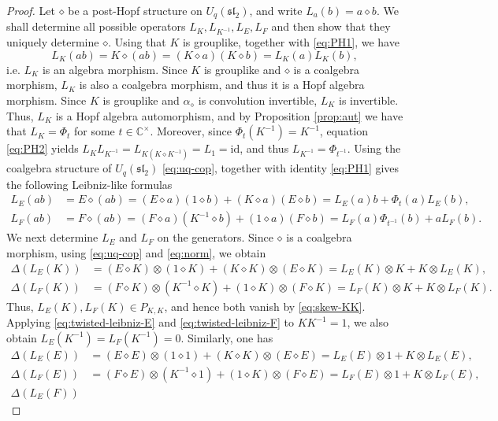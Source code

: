 \documentclass[11pt,english]{article}
\newcommand{\id}{\mathrm{id}}
\newcommand{\Del}{\Delta}
\newcommand{\act}{\mathbin{\diamond}}
\theoremstyle{definition}
\begin{document}
\begin{proof}
Let $\act$ be a post-Hopf structure on
$U_q(\mathfrak{sl}_2)$, and write
$L_a(b)=a\act b$.
We shall determine all possible operators
$L_K,L_{K^{-1}},L_E,L_F$ and then show that
they uniquely determine $\act$.
Using that $K$ is grouplike, together with \eqref{eq:PH1}, we have
\[L_K(ab)= K \act(ab)= (K \act a)(K \act b) = L_K(a) L_K(b), \]
i.e. $L_K$ is an algebra morphism. 
Since $K$ is grouplike and $\act$ is a coalgebra morphism, $L_K$
is also a coalgebra morphism, and thus it is a Hopf algebra morphism. 
Since $K$ is grouplike and $\alpha_{\act}$
is convolution invertible, $L_K$ is invertible.
Thus, $L_K$ is a Hopf algebra automorphism, and by
Proposition \ref{prop:aut} we have that $L_K=\Phi_t$
for some $t\in\mathbb{C}^\times$.
Moreover, since $\Phi_t(K^{-1})=K^{-1}$,
equation \eqref{eq:PH2} yields $L_KL_{K^{-1}}
=L_{K(K\act K^{-1})}
=L_1=\id$, and thus $L_{K^{-1}}=\Phi_{t^{-1}}$.
Using the coalgebra structure of $U_q(\mathfrak{sl}_2)$ \eqref{eq:uq-cop}, together with
identity \eqref{eq:PH1} gives the following Leibniz-like formulas
\begin{align}
L_E(ab)&= E \act (ab) = (E \act a)(1 \act b) + (K \act a)(E \act b) =L_E(a)b+\Phi_t(a)L_E(b),
\label{eq:twisted-leibniz-E}\\
L_F(ab)&= F \act (ab)= (F \act a)(K^{-1} \act b) + (1 \act a) (F \act b)=L_F(a)\Phi_{t^{-1}}(b)+aL_F(b).
\label{eq:twisted-leibniz-F}
\end{align}
We next determine $L_E$ and $L_F$ on the
generators. 
Since $\act$ is a coalgebra morphism, using
\eqref{eq:uq-cop} and \eqref{eq:norm}, we obtain
\begin{align*}
\Del(L_E(K))&=(E\act K)\otimes(1\act K)
 +(K\act K)\otimes(E\act K)
=L_E(K)\otimes K+K\otimes L_E(K),\\
\Del(L_F(K))
&=(F\act K)\otimes(K^{-1}\act K)
 +(1\act K)\otimes(F\act K)
=L_F(K)\otimes K+K\otimes L_F(K).
\end{align*}
Thus, $L_E(K),L_F(K)\in P_{K,K}$, and hence
both vanish by \eqref{eq:skew-KK}.
Applying \eqref{eq:twisted-leibniz-E} and
\eqref{eq:twisted-leibniz-F} to $KK^{-1}=1$, we also obtain $L_E(K^{-1})=L_F(K^{-1})=0.$
Similarly, one has 
\[
\begin{aligned}
\Del(L_E(E))
&=(E\act E)\otimes(1\act1)
 +(K\act K)\otimes(E\act E)=L_E(E)\otimes1+K\otimes L_E(E),\\
\Del(L_F(E))
&=(F\act E)\otimes(K^{-1}\act1)
 +(1\act K)\otimes(F\act E)=L_F(E)\otimes1+K\otimes L_F(E),\\ 
\Del(L_E(F))

\end{aligned}\]
\end{proof}
\end{document}

